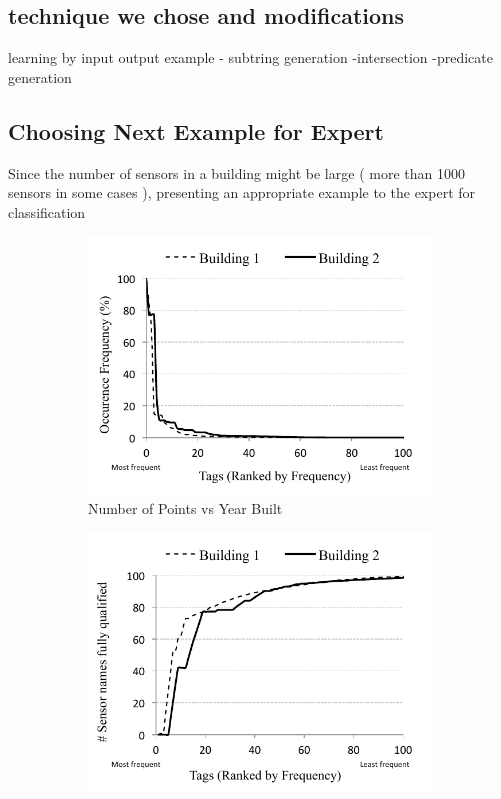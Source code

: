 \subsection{technique we chose and modifications}

learning by input output example
- subtring generation
-intersection
-predicate generation


\subsection{Choosing Next Example for Expert}

Since the number of sensors in a building might be large ( more than 1000 sensors in some cases ), presenting an appropriate example to the expert for classification 
\begin{figure}[ht]
\centering
	\begin{subfigure}{0.48\textwidth}
                \centering
		\includegraphics[width=\textwidth]{./figs/pointOccuranceFreq.pdf}
                \caption{Number of Points vs Year Built}
                \label{fig:sense_pts_data_yb}
	\end{subfigure}
	\begin{subfigure}{0.48\textwidth}
                \centering
		\includegraphics[width=\textwidth]{./figs/pointCDF}

\end{subfigure}
\end{figure}
